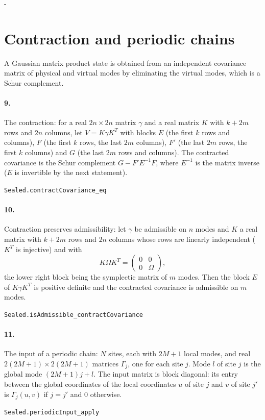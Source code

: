 \documentclass[11pt]{article}
\makeatletter
\newcommand{\keepspace}[1]{\par\penalty-100\begingroup\setlength{\dimen@}{#1}\dimen@ii\pagegoal\advance\dimen@ii-\pagetotal\ifdim\dimen@>\dimen@ii\ifdim\dimen@ii>\z@\vfil\fi\break\fi\endgroup}
\makeatother
\begin{document}
\keepspace{14\baselineskip}\section*{Contraction and periodic chains}
A Gaussian matrix product state is obtained from an independent covariance matrix of physical and virtual modes by eliminating the virtual modes, which is a Schur complement.

\paragraph{9.} The contraction: for a real $2n \times 2n$ matrix $\gamma$ and a real matrix $K$ with $k + 2m$ rows and $2n$ columns, let $V = K \gamma K^T$ with blocks $E$ (the first $k$ rows and columns), $F$ (the first $k$ rows, the last $2m$ columns), $F'$ (the last $2m$ rows, the first $k$ columns) and $G$ (the last $2m$ rows and columns). The contracted covariance is the Schur complement $G - F' E^{-1} F$, where $E^{-1}$ is the matrix inverse ($E$ is invertible by the next statement).\par{\footnotesize\texttt{Sealed.contractCovariance\_eq}}

\paragraph{10.} Contraction preserves admissibility: let $\gamma$ be admissible on $n$ modes and $K$ a real matrix with $k + 2m$ rows and $2n$ columns whose rows are linearly independent ($K^T$ is injective) and with \[K \Omega K^T = \begin{pmatrix} 0 & 0 \\ 0 & \Omega \end{pmatrix},\] the lower right block being the symplectic matrix of $m$ modes. Then the block $E$ of $K\gamma K^T$ is positive definite and the contracted covariance is admissible on $m$ modes.\par{\footnotesize\texttt{Sealed.isAdmissible\_contractCovariance}}

\paragraph{11.} The input of a periodic chain: $N$ sites, each with $2M + 1$ local modes, and real $2(2M+1) \times 2(2M+1)$ matrices $\Gamma_j$, one for each site $j$. Mode $l$ of site $j$ is the global mode $(2M+1) j + l$. The input matrix is block diagonal: its entry between the global coordinates of the local coordinates $u$ of site $j$ and $v$ of site $j'$ is $\Gamma_j(u, v)$ if $j = j'$ and $0$ otherwise.\par{\footnotesize\texttt{Sealed.periodicInput\_apply}}
\end{document}
